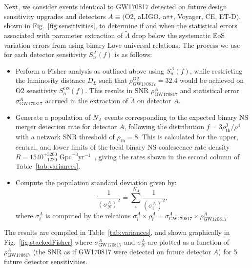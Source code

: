 \documentclass[prd,twocolumn,nofootinbib,superscriptaddress,amsmath,amssymb]{revtex4-1}
\begin{document}
Next, we consider events identical to GW170817 detected on future design sensitivity upgrades and detectors $A \equiv ($O2, aLIGO, a\texttt{++}, Voyager, CE, ET-D$)$, shown in Fig.~\ref{fig:sensitivities}, to determine if and when the statistical errors associated with parameter extraction of $\tilde{\Lambda}$ drop below the systematic EoS variation errors from using binary Love universal relations.
The process we use for each detector sensitivity $S_n^A(f)$ is as follows:
\begin{itemize}
\item Perform a Fisher analysis as outlined above using $S_n^A(f)$, while restricting the luminosity distance $D_L$ such that $\rho^{\text{O2}}_{\text{GW170817}}=32.4$ would be achieved on O2 sensitivity $S_n^{\text{O2}}(f)$.
This results in SNR $\rho^A_{\text{GW170817}}$ and statistical error $\sigma_\text{GW170817}^A$ accrued in the extraction of $\tilde{\Lambda}$ on detector $A$.
\item Generate a population of $N_A$ events corresponding to the expected binary NS merger detection rate for detector $A$, following the distribution $f=3 \rho_{\text{th}}^3/\rho^4$~\cite{Shutz:SNR,Chen:SNR} with a network SNR threshold of $\rho_{\text{th}}=8$.
This is calculated for the upper, central, and lower limits of the local binary NS coalescence rate density $R=1540^{+3200}_{-1220} \text{ Gpc}^{-3}\text{yr}^{-1}$~\cite{Abbott2017}, giving the rates shown in the second column of Table~\ref{tab:variances}.
\item Compute the population standard deviation given by:
\begin{equation}
\frac{1}{(\sigma_N^A)^2}=\sum_i^{N_A}\frac{1}{(\sigma_i^A)^2},
\end{equation}
where $\sigma_i^A$ is computed by the relations $\sigma_i^A \times \rho_i^A = \sigma_{\text{GW170817}}^A \times \rho_{\text{GW170817}}^A$.
\end{itemize}
The results are compiled in Table~\ref{tab:variances}, and shown graphically in Fig.~\ref{fig:stackedFisher} where $\sigma^A_{\text{GW170817}}$ and $\sigma^A_N$ are plotted as a function of $\rho^A_{\text{GW170817}}$ (the SNR as if GW170817 were detected on future detector $A$) for 5 future detector sensitivities.
\end{document}
